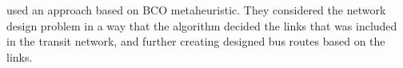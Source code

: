 used an approach based on BCO metaheuristic. They considered the network design problem in a way that the algorithm decided the links that was included in the transit network, and further creating designed bus routes based on the links. 

